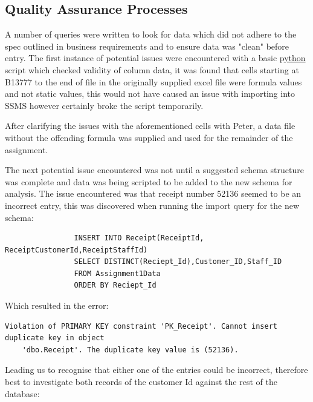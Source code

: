 \documentclass{article}
\begin{document}
        \subsection{Quality Assurance Processes}
        \label{sec:QAP}
            A number of queries were written to look for data which did not adhere to the spec
            outlined in business requirements and to ensure data was "clean" before entry.
            The first instance of potential issues were encountered with a basic \hyperref[sec:Python]{\color{blue}python} script
            which checked validity of column data, it was found that cells starting at B13777
            to the end of file in the originally supplied excel file were formula values and 
            not static values, this would not have caused an issue with importing into SSMS 
            however certainly broke the script temporarily.
            \par
            After clarifying the issues with the aforementioned cells with Peter, a data file without
            the offending formula was supplied and used for the remainder of the assignment.
            \vspace{5mm}
            \par\noindent
            The next potential issue encountered was not until a suggested schema structure 
            was complete and data was being scripted to be added to the new schema for analysis.
            The issue encountered was that receipt number 52136 seemed to be an incorrect 
            entry, this was discovered when running the import query for the new schema:

            \begin{lstlisting}
                INSERT INTO Receipt(ReceiptId, ReceiptCustomerId,ReceiptStaffId)
                SELECT DISTINCT(Reciept_Id),Customer_ID,Staff_ID
                FROM Assignment1Data
                ORDER BY Reciept_Id
            \end{lstlisting}

            Which resulted in the error:
            \color{red}
            \begin{Verbatim}[fontsize=\small]
    Violation of PRIMARY KEY constraint 'PK_Receipt'. Cannot insert duplicate key in object 
    'dbo.Receipt'. The duplicate key value is (52136).
            \end{Verbatim}
            \color{black}

            Leading us to recognise that either one of the entries could be incorrect, therefore
            best to investigate both records of the customer Id against the rest of the database:
\end{document}
